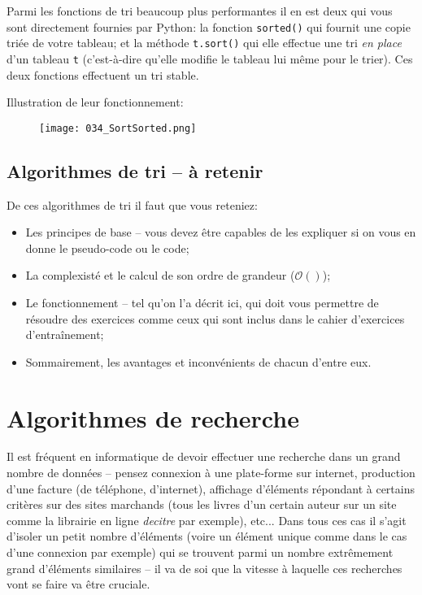 \documentclass[12pt]{article}
\begin{document}
	Parmi les fonctions de tri beaucoup plus performantes il en est deux qui vous sont directement fournies par Python: la fonction \texttt{sorted()} qui fournit une copie triée de votre tableau; et la méthode \texttt{t.sort()} qui elle effectue une tri \textit{en place} d'un tableau \texttt{t} (c'est-à-dire qu'elle modifie le tableau lui même pour le trier). Ces deux fonctions effectuent un tri stable.
	
	Illustration de leur fonctionnement:
	\begin{figure}[H]
		\centering
		\texttt{[image: 034\_SortSorted.png]}
	\end{figure}
	
	\subsection{Algorithmes de tri -- à retenir}
		\begin{MonRet}
		De ces algorithmes de tri il faut que vous reteniez:
		\begin{itemize}
			\item Les principes de base -- vous devez être capables de les expliquer si on vous en donne le pseudo-code ou le code;
			\item La complexisté et le calcul de son ordre de grandeur ($\mathcal{O}()$);
			\item Le fonctionnement -- tel qu'on l'a décrit ici, qui doit vous permettre de résoudre des exercices comme ceux qui sont inclus dans le cahier d'exercices d'entraînement;
			\item Sommairement, les avantages et inconvénients de chacun d'entre eux.
		\end{itemize}
	\end{MonRet}
	
	\pagebreak
	\section{Algorithmes de recherche}
	Il est fréquent en informatique de devoir effectuer une recherche dans un grand nombre de données -- pensez connexion à une plate-forme sur internet, production d'une facture (de téléphone, d'internet), affichage d'éléments répondant à certains critères sur des sites marchands (tous les livres d'un certain auteur sur un site comme la librairie en ligne \textit{decitre} par exemple), etc... Dans tous ces cas il s'agit d'isoler un petit nombre d'éléments (voire un élément unique comme dans le cas d'une connexion par exemple) qui se trouvent parmi un nombre extrêmement grand d'éléments similaires -- il va de soi que la vitesse à laquelle ces recherches vont se faire va être cruciale.
	
\end{document}
